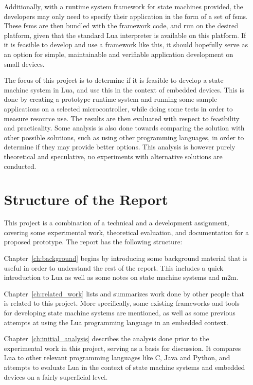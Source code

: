 \noindent
Additionally, with a runtime system framework for state machines provided, the developers may only need to specify their application in the form of a set of \glspl{fsm}. These \glspl{fsm} are then bundled with the framework code, and run on the desired platform, given that the standard Lua interpreter is available on this platform. If it is feasible to develop and use a framework like this, it should hopefully serve as an option for simple, maintainable and verifiable application development on small devices.

\noindent
The focus of this project is to determine if it is feasible to develop a state machine system in Lua, and use this in the context of embedded devices. This is done by creating a prototype runtime system and running some sample applications on a selected microcontroller, while doing some tests in order to measure resource use. The results are then evaluated with respect to feasibility and practicality. Some analysis is also done towards comparing the solution with other possible solutions, such as using other programming languages, in order to determine if they may provide better options. This analysis is however purely theoretical and speculative, no experiments with alternative solutions are conducted.

\section{Structure of the Report}
\label{sec:structure}
This project is a combination of a technical and a development assignment, covering some experimental work, theoretical evaluation, and documentation for a proposed prototype. The report has the following structure:

\noindent
Chapter~\ref{ch:background} begins by introducing some background material that is useful in order to understand the rest of the report. This includes a quick introduction to Lua as well as some notes on state machine systems and \gls{m2m}.

\noindent
Chapter~\ref{ch:related_work} lists and summarizes work done by other people that is related to this project. More specifically, some existing frameworks and tools for developing state machine systems are mentioned, as well as some previous attempts at using the Lua programming language in an embedded context.

\noindent
Chapter~\ref{ch:initial_analysis} describes the analysis done prior to the experimental work in this project, serving as a basis for discussion. It compares Lua to other relevant programming languages like C, Java and Python, and attempts to evaluate Lua in the context of state machine systems and embedded devices on a fairly superficial level.


